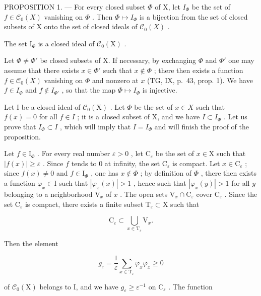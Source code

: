 PROPOSITION 1. --- For every closed subset \(\Phi\) of X, let \(I_{\Phi}\) be the set of \(f \in \mathcal{C}_0(X)\) vanishing on \(\Phi\) . Then \(\Phi \mapsto I_{\Phi}\) is a bijection from the set of closed subsets of X onto the set of closed ideals of \(\mathcal{C}_0(X)\) .

The set \(\mathrm{I}_{\Phi}\) is a closed ideal of \(\mathcal{C}_0(\mathrm{X})\) .

Let \(\Phi \neq \Phi'\) be closed subsets of X. If necessary, by exchanging \(\Phi\) and \(\Phi'\) one may assume that there exists \(x \in \Phi'\) such that \(x \notin \Phi\) ; there then exists a function \(f \in \mathcal{C}_0(X)\) vanishing on \(\Phi\) and nonzero at \(x\) (TG, IX, p.~43, prop. 1). We have \(f \in I_{\Phi}\) and \(f \notin I_{\Phi'}\) , so that the map \(\Phi \mapsto I_{\Phi}\) is injective.

Let I be a closed ideal of \(\mathcal{C}_{0}(\mathrm{X})\) . Let \(\Phi\) be the set of \(x \in X\) such that \(f(x) = 0\) for all \(f \in I\) ; it is a closed subset of X, and we have \(I \subset I_{\Phi}\) . Let us prove that \(I_{\Phi} \subset I\) , which will imply that \(I = I_{\Phi}\) and will finish the proof of the proposition.

Let \(f \in \mathrm{I}_{\Phi}\) . For every real number \(\varepsilon > 0\) , let \(\mathrm{C}_{\varepsilon}\) be the set of \(x \in \mathrm{X}\) such that \(|f(x)| \geqslant \varepsilon\) . Since \(f\) tends to 0 at infinity, the set \(\mathrm{C}_{\varepsilon}\) is compact. Let \(x \in \mathrm{C}_{\varepsilon}\) ; since \(f(x) \neq 0\) and \(f \in \mathrm{I}_{\Phi}\) , one has \(x \notin \Phi\) ; by definition of \(\Phi\) , there then exists a function \(\varphi_x \in \mathrm{I}\) such that \(|\varphi_x(x)| > 1\) , hence such that \(|\varphi_x(y)| > 1\) for all \(y\) belonging to a neighborhood \(\mathrm{V}_x\) of \(x\) . The open sets \(\mathrm{V}_x \cap \mathrm{C}_{\varepsilon}\) cover \(\mathrm{C}_{\varepsilon}\) . Since the set \(\mathrm{C}_{\varepsilon}\) is compact, there exists a finite subset \(\mathrm{T}_{\varepsilon} \subset \mathrm{X}\) such that

\[
\mathrm{C} _ {\varepsilon} \subset \bigcup_ {x \in \mathrm{T} _ {\varepsilon}} \mathrm{V} _ {x}.
\]

Then the element

\[
g _ {\varepsilon} = \frac {1}{\varepsilon} \sum_ {x \in \mathrm{T} _ {\varepsilon}} \varphi_ {x} \overline {{\varphi_ {x}}} \geqslant 0
\]

of \(\mathcal{C}_0(\mathrm{X})\) belongs to I, and we have \(g_{\varepsilon} \geqslant \varepsilon^{-1}\) on \(\mathrm{C}_{\varepsilon}\) . The function

